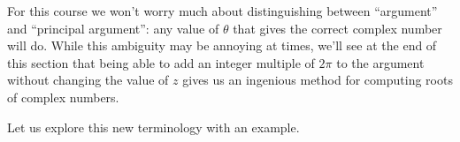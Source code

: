 For this course we won't worry much about distinguishing between ``argument'' and ``principal argument'': any value of $\theta$ that gives the correct complex number will do. While this ambiguity may be annoying at times, we'll see at the end of this section that being able to add an integer multiple of $2\pi$ to the argument without changing the value of $z$ gives us an ingenious method for computing roots of complex numbers.

Let us explore this new terminology with an example.


\medskip

